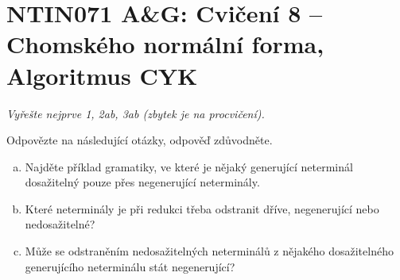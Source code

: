 \documentclass[a4paper,12pt]{amsart}
\begin{document}
\thispagestyle{empty}

\section*{NTIN071 A\&G: Cvičení 8 -- Chomského normální forma, Algoritmus CYK}


\medskip

\noindent\emph{Vyřešte nejprve 1, 2ab, 3ab (zbytek je na procvičení).}

\medskip


\medskip\begin{problem}
    
    Odpovězte na následující otázky, odpověď zdůvodněte.
    
    \begin{enumerate}[(a)]\setlength{\itemsep}{6pt}
        \item Najděte příklad gramatiky, ve které je nějaký generující neterminál dosažitelný pouze přes negenerující neterminály.
        \item Které neterminály je při redukci třeba odstranit dříve, negenerující nebo nedosažitelné?
        \item Může se odstraněním nedosažitelných neterminálů z nějakého dosažitelného generujícího neterminálu stát negenerující?
    \end{enumerate}

\end{problem}
    
\end{document}
